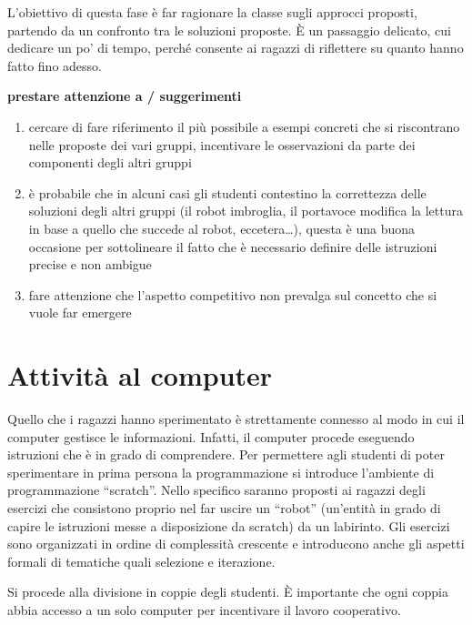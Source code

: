 \documentclass[12pt]{article}
\begin{document}
L’obiettivo di questa fase è far ragionare la classe sugli approcci proposti, partendo da un confronto tra le soluzioni proposte. È un passaggio delicato, cui dedicare un po’ di tempo, perché consente ai ragazzi di riflettere su quanto hanno fatto fino adesso.

\textbf{prestare attenzione a / suggerimenti}
\begin{enumerate}
\item cercare di fare riferimento il più possibile a esempi concreti che si riscontrano nelle proposte dei vari gruppi, incentivare le osservazioni da parte dei componenti degli altri gruppi
\item è probabile che in alcuni casi gli studenti contestino la correttezza delle soluzioni degli altri gruppi (il robot imbroglia, il portavoce modifica la lettura in base a quello che succede al robot, eccetera…), questa è una buona occasione per sottolineare il fatto che è necessario definire delle istruzioni precise e non ambigue
\item fare attenzione che l’aspetto competitivo non prevalga sul concetto che si vuole far emergere
\end{enumerate}

\section{Attività al computer}

Quello che i ragazzi hanno sperimentato è strettamente connesso al modo in cui il computer gestisce le informazioni. Infatti, il computer procede eseguendo istruzioni che è in grado di comprendere.
Per permettere agli studenti di poter sperimentare in prima persona la programmazione si introduce l’ambiente di programmazione ``scratch”. Nello specifico saranno proposti ai ragazzi degli esercizi che consistono proprio nel far uscire un “robot” (un’entità in grado di capire le istruzioni messe a disposizione da scratch) da un labirinto. Gli esercizi sono organizzati in ordine di complessità crescente e introducono anche gli aspetti formali di tematiche quali selezione e iterazione. 

Si procede alla divisione in coppie degli studenti. È importante che ogni coppia abbia accesso a un solo computer per incentivare il lavoro cooperativo. 
\end{document}

